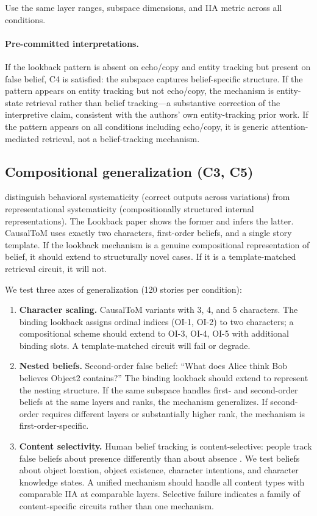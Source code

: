 \documentclass{article}
\begin{document}
Use the same layer ranges, subspace dimensions, and IIA metric across all conditions.

\paragraph{Pre-committed interpretations.} If the lookback pattern is absent on echo/copy and entity tracking but present on false belief, C4 is satisfied: the subspace captures belief-specific structure. If the pattern appears on entity tracking but not echo/copy, the mechanism is entity-state retrieval rather than belief tracking---a substantive correction of the interpretive claim, consistent with the authors' own entity-tracking prior work. If the pattern appears on all conditions including echo/copy, it is generic attention-mediated retrieval, not a belief-tracking mechanism.

\subsection{Compositional generalization (C3, C5)}
\label{sec:composition}

\citet{vegner2025systematicity} distinguish behavioral systematicity (correct outputs across variations) from representational systematicity (compositionally structured internal representations). The Lookback paper shows the former and infers the latter. CausalToM uses exactly two characters, first-order beliefs, and a single story template. If the lookback mechanism is a genuine compositional representation of belief, it should extend to structurally novel cases. If it is a template-matched retrieval circuit, it will not.

We test three axes of generalization (120 stories per condition):

\begin{enumerate}
\item \textbf{Character scaling.} CausalToM variants with 3, 4, and 5 characters. The binding lookback assigns ordinal indices (OI-1, OI-2) to two characters; a compositional scheme should extend to OI-3, OI-4, OI-5 with additional binding slots. A template-matched circuit will fail or degrade.
\item \textbf{Nested beliefs.} Second-order false belief: ``What does Alice think Bob believes Object2 contains?'' The binding lookback should extend to represent the nesting structure. If the same subspace handles first- and second-order beliefs at the same layers and ranks, the mechanism generalizes. If second-order requires different layers or substantially higher rank, the mechanism is first-order-specific.
\item \textbf{Content selectivity.} Human belief tracking is content-selective: people track false beliefs about presence differently than about absence \citep{schuwerk2015implicit}. We test beliefs about object location, object existence, character intentions, and character knowledge states. A unified mechanism should handle all content types with comparable IIA at comparable layers. Selective failure indicates a family of content-specific circuits rather than one mechanism.
\end{enumerate}
\end{document}
